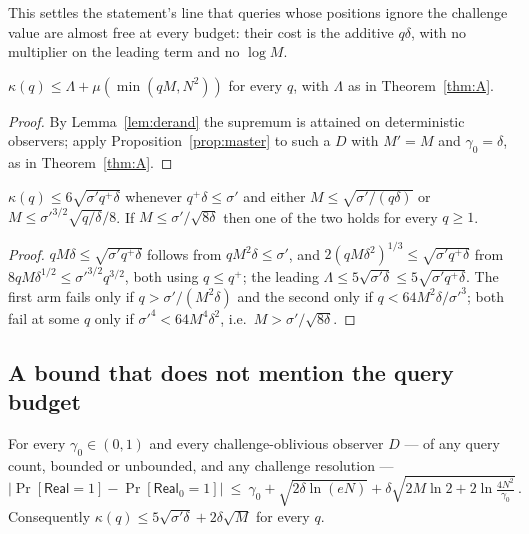 \documentclass{aicr-solution}
\newcommand{\Real}{\mathsf{Real}}
\newcommand{\Prob}[1]{\Pr\!\left[#1\right]}
\begin{document}
This settles the statement's line that queries whose positions ignore the
challenge value are almost free at every budget: their cost is the additive
$q\delta$, with no multiplier on the leading term and no $\log M$.

\begin{theorem}\label{thm:B}
$\kappa(q)\le\Lambda+\mu(\min(qM,N^{2}))$ for every $q$, with $\Lambda$ as in
Theorem~\ref{thm:A}.
\end{theorem}

\begin{proof}
By Lemma~\ref{lem:derand} the supremum is attained on deterministic observers;
apply Proposition~\ref{prop:master} to such a $D$ with $M'=M$ and
$\gamma_0=\delta$, as in Theorem~\ref{thm:A}.
\end{proof}

\begin{corollary}\label{cor:B}
$\kappa(q)\le6\sqrt{\sigma'q^{+}\delta}$ whenever $q^{+}\delta\le\sigma'$ and
either $M\le\sqrt{\sigma'/(q\delta)}$ or
$M\le\sigma'^{3/2}\sqrt{q/\delta}/8$. If $M\le\sigma'/\sqrt{8\delta}$ then one
of the two holds for every $q\ge1$.
\end{corollary}

\begin{proof}
$qM\delta\le\sqrt{\sigma'q^{+}\delta}$ follows from $qM^{2}\delta\le\sigma'$, and
$2(qM\delta^{2})^{1/3}\le\sqrt{\sigma'q^{+}\delta}$ from
$8qM\delta^{1/2}\le\sigma'^{3/2}q^{3/2}$, both using $q\le q^{+}$; the leading
$\Lambda\le5\sqrt{\sigma'\delta}\le5\sqrt{\sigma'q^{+}\delta}$. The first arm fails
only if $q>\sigma'/(M^{2}\delta)$ and the second only if
$q<64M^{2}\delta/\sigma'^{3}$; both fail at some $q$ only if
$\sigma'^{4}<64M^{4}\delta^{2}$, i.e.\ $M>\sigma'/\sqrt{8\delta}$.
\end{proof}

\subsection*{A bound that does not mention the query budget}

\begin{theorem}\label{thm:D}
For every $\gamma_0\in(0,1)$ and every challenge-oblivious observer $D$ --- of any
query count, bounded or unbounded, and any challenge resolution ---
\[
  \bigl|\Prob{\Real=1}-\Prob{\Real_0=1}\bigr|\ \le\ \gamma_0
  +\sqrt{2\delta\ln(eN)}+\delta\sqrt{2M\ln2+2\ln\tfrac{4N^{2}}{\gamma_0}}\,.
\]
Consequently $\kappa(q)\le5\sqrt{\sigma'\delta}+2\delta\sqrt M$ for every $q$.
\end{theorem}
\end{document}
